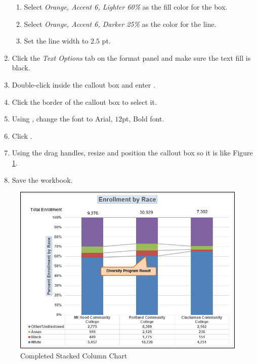 \begin{enumerate}
	\begin{enumerate}
		\item Select \textit{Orange, Accent 6, Lighter 60\%} as the fill color for the box.
		\item Select \textit{Orange, Accent 6, Darker 25\%} as the color for the line.
		\item Set the line width to $ 2.5 $ pt.
	\end{enumerate}
	
	\item Click the \textit{Text Options} tab on the format panel and make sure the text fill is black.
	\item Double-click inside the callout box and enter .
	\item Click the border of the callout box to select it.
	\item Using , change the font to Arial, $ 12 $pt, Bold font. 
	\item Click .
	\item Using the drag handles, resize and position the callout box so it is like Figure \ref{04:fig45}.
	\item Save the  workbook.
\end{enumerate}

\begin{figure}[H]
	\centering
	\includegraphics[width=\maxwidth{.95\linewidth}]{gfx/ch04_fig45}
	\caption{Completed Stacked Column Chart}
	\label{04:fig45}
\end{figure}

